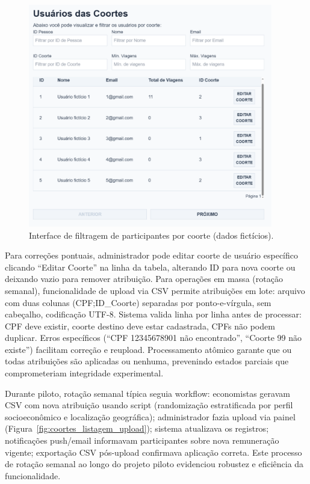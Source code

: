  \begin{figure}[H]
    \centering
    \includegraphics[width=0.95\textwidth]{figuras/usuario_coortes_zoom.PNG}
    \caption{Interface de filtragem de participantes por coorte (dados fictícios).}
    \label{fig:coortes_listagem_usuarios}
  \end{figure}

Para correções pontuais, administrador pode editar coorte de usuário específico clicando ``Editar Coorte'' na linha da tabela, alterando ID para nova coorte ou deixando vazio para remover atribuição. Para operações em massa (rotação semanal), funcionalidade de upload via CSV permite atribuições em lote: arquivo com duas colunas (CPF;ID\_Coorte) separadas por ponto-e-vírgula, sem cabeçalho, codificação UTF-8. Sistema valida linha por linha antes de processar: CPF deve existir, coorte destino deve estar cadastrada, CPFs não podem duplicar. Erros específicos (``CPF 12345678901 não encontrado'', ``Coorte 99 não existe'') facilitam correção e reupload. Processamento atômico garante que ou todas atribuições são aplicadas ou nenhuma, prevenindo estados parciais que comprometeriam integridade experimental.

Durante piloto, rotação semanal típica seguia workflow: economistas geravam CSV com nova atribuição usando script (randomização estratificada por perfil socioeconômico e localização geográfica); administrador fazia upload via painel (Figura~\ref{fig:coortes_listagem_upload}); sistema atualizava os registros; notificações push/email informavam participantes sobre nova remuneração vigente; exportação CSV pós-upload confirmava aplicação correta. Este processo de rotação semanal ao longo do projeto piloto evidenciou robustez e eficiência da funcionalidade.

